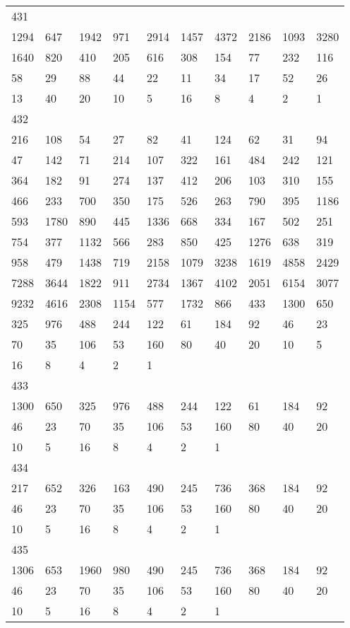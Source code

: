 \begin{longtable}{*{10}{l}}
431&&&&&&&&&\\
1294& 647& 1942& 971& 2914& 1457& 4372& 2186& 1093& 3280\\
1640& 820& 410& 205& 616& 308& 154& 77& 232& 116\\
58& 29& 88& 44& 22& 11& 34& 17& 52& 26\\
13& 40& 20& 10& 5& 16& 8& 4& 2& 1\\

432&&&&&&&&&\\
216& 108& 54& 27& 82& 41& 124& 62& 31& 94\\
47& 142& 71& 214& 107& 322& 161& 484& 242& 121\\
364& 182& 91& 274& 137& 412& 206& 103& 310& 155\\
466& 233& 700& 350& 175& 526& 263& 790& 395& 1186\\
593& 1780& 890& 445& 1336& 668& 334& 167& 502& 251\\
754& 377& 1132& 566& 283& 850& 425& 1276& 638& 319\\
958& 479& 1438& 719& 2158& 1079& 3238& 1619& 4858& 2429\\
7288& 3644& 1822& 911& 2734& 1367& 4102& 2051& 6154& 3077\\
9232& 4616& 2308& 1154& 577& 1732& 866& 433& 1300& 650\\
325& 976& 488& 244& 122& 61& 184& 92& 46& 23\\
70& 35& 106& 53& 160& 80& 40& 20& 10& 5\\
16& 8& 4& 2& 1& \\

433&&&&&&&&&\\
1300& 650& 325& 976& 488& 244& 122& 61& 184& 92\\
46& 23& 70& 35& 106& 53& 160& 80& 40& 20\\
10& 5& 16& 8& 4& 2& 1& \\

434&&&&&&&&&\\
217& 652& 326& 163& 490& 245& 736& 368& 184& 92\\
46& 23& 70& 35& 106& 53& 160& 80& 40& 20\\
10& 5& 16& 8& 4& 2& 1& \\

435&&&&&&&&&\\
1306& 653& 1960& 980& 490& 245& 736& 368& 184& 92\\
46& 23& 70& 35& 106& 53& 160& 80& 40& 20\\
10& 5& 16& 8& 4& 2& 1& \\


\end{longtable}
